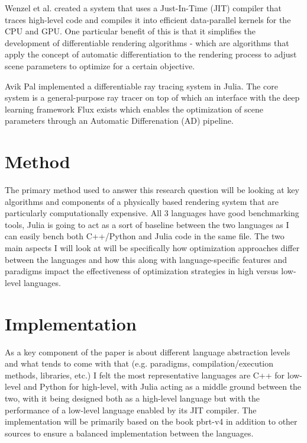 \documentclass[11pt,a4paper,oneside]{article}
\begin{document}
\smallskip 
Wenzel et al. \cite{Jakob2020DrJit} created a system that uses a Just-In-Time (JIT) compiler that traces high-level code and compiles it into efficient data-parallel kernels for the CPU and GPU. One particular benefit of this is that it simplifies the development of differentiable rendering algorithms - which are algorithms that apply the concept of automatic differentiation to the rendering process to adjust scene parameters to optimize for a certain objective. 

\smallskip 
Avik Pal \cite{Pal2020} implemented a differentiable ray tracing system in Julia. The core system is a general-purpose ray tracer on top of which an interface with the deep learning framework Flux exists which enables the optimization of scene parameters through an Automatic Differenation (AD) pipeline.

\section{Method}

The primary method used to answer this research question will be looking at key algorithms and components of a physically based rendering system that are particularly computationally expensive. All 3 languages have good benchmarking tools, Julia is going to act as a sort of baseline between the two languages as I can easily bench both C++/Python and Julia code in the same file. The two main aspects I will look at will be specifically how optimization approaches differ between the languages and how this along with language-specific features and paradigms impact the effectiveness of optimization strategies in high versus low-level languages.

\section{Implementation}

As a key component of the paper is about different language abstraction levels and what tends to come with that (e.g. paradigms, compilation/execution methods, libraries, etc.) I felt the most representative languages are C++ for low-level and Python for high-level, with Julia acting as a middle ground between the two, with it being designed both as a high-level language but with the performance of a low-level language enabled by its JIT compiler. The implementation will be primarily based on the book pbrt-v4 in addition to other sources to ensure a balanced implementation between the languages. 
\end{document}
